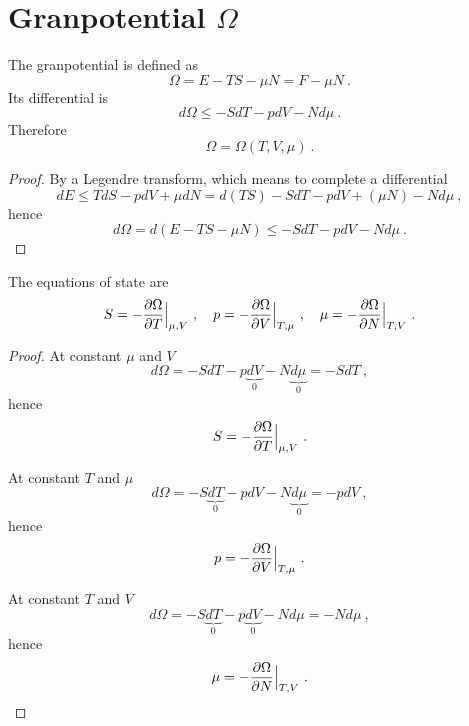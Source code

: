 \section{Granpotential $\Omega$} 

    The granpotential is defined as 
    \begin{equation*}
        \Omega = E - TS - \mu N = F - \mu N ~.
    \end{equation*}
    Its differential is 
    \begin{equation*}
        d\Omega \leq - SdT - pdV - N d\mu ~.
    \end{equation*}
    Therefore
    \begin{equation*}
        \Omega = \Omega(T, V, \mu) ~.
    \end{equation*}
    \begin{proof}
        By a Legendre transform, which means to complete a differential
        \begin{equation*}
            dE \leq T dS - p dV + \mu dN = d(TS) - SdT - p dV + (\mu N) - N d\mu ~,
        \end{equation*}
        hence 
        \begin{equation*}
            d\Omega = d(E - TS - \mu N) \leq - SdT - p dV - N d\mu ~.
        \end{equation*}
    \end{proof}

    The equations of state are
    \begin{equation}
        S = - \frac{\partial\Omega}{\partial T} \Big \vert_{\mu,V} ~, \quad p = - \frac{\partial\Omega}{\partial V} \Big \vert_{T,\mu} ~, \quad \mu = - \frac{\partial\Omega}{\partial N} \Big \vert_{T,V} ~. 
    \end{equation}
    \begin{proof}
        At constant $\mu$ and $V$
        \begin{equation*}
            d\Omega = - SdT - p\underbrace{dV}_0 - N \underbrace{d\mu}_0 = - S dT ~,
        \end{equation*}
        hence 
        \begin{equation*}
            S = - \frac{\partial\Omega}{\partial T} \Big \vert_{\mu,V} ~.
        \end{equation*}

        At constant $T$ and $\mu$
        \begin{equation*}
            d\Omega = - S \underbrace{dT}_0 - pdV - N \underbrace{d\mu}_ 0 = - p dV ~,
        \end{equation*}
        hence 
        \begin{equation*}
            p = - \frac{\partial\Omega}{\partial V} \Big \vert_{T,\mu} ~.
        \end{equation*}

        At constant $T$ and $V$
        \begin{equation*}
            d\Omega = - S\underbrace{dT}_0 - p\underbrace{dV}_0 - N d\mu = - N d\mu~,
        \end{equation*}
        hence 
        \begin{equation*}
            \mu = - \frac{\partial\Omega}{\partial N} \Big \vert_{T,V} ~.
        \end{equation*}
    \end{proof}


